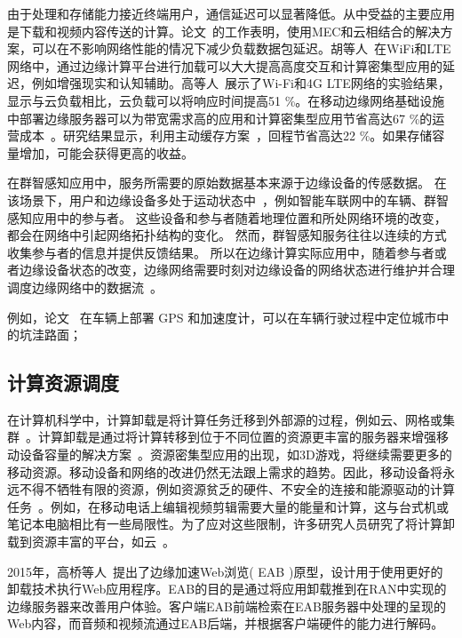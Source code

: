 由于处理和存储能力接近终端用户，通信延迟可以显著降低。从中受益的主要应用是下载和视频内容传送的计算。论文~\cite{DBLP:conf/infocom/RimalVM16}的工作表明，使用MEC和云相结合的解决方案，可以在不影响网络性能的情况下减少负载数据包延迟。胡等人~\cite{DBLP:conf/apsys/HuGHWACPS16}在WiFi和LTE网络中，通过边缘计算平台进行加载可以大大提高高度交互和计算密集型应用的延迟，例如增强现实和认知辅助。高等人~\cite{gao2015cloudlets}展示了Wi-Fi和4G LTE网络的实验结果，显示与云负载相比，云负载可以将响应时间提高51 \%。在移动边缘网络基础设施中部署边缘服务器可以为带宽需求高的应用和计算密集型应用节省高达67 \%的运营成本~\cite{DBLP:conf/saso/MehtaTKTKE16}。研究结果显示，利用主动缓存方案~\cite{DBLP:journals/cm/BastugBD14}，回程节省高达22 \%。如果存储容量增加，可能会获得更高的收益。

在群智感知应用中，服务所需要的原始数据基本来源于边缘设备的传感数据。
在该场景下，用户和边缘设备多处于运动状态中~\cite{}，例如智能车联网中的车辆、群智感知应用中的参与者。
这些设备和参与者随着地理位置和所处网络环境的改变，都会在网络中引起网络拓扑结构的变化。
然而，群智感知服务往往以连续的方式收集参与者的信息并提供反馈结果。
所以在边缘计算实际应用中，随着参与者或者边缘设备状态的改变，边缘网络需要时刻对边缘设备的网络状态进行维护并合理调度边缘网络中的数据流~\cite{}。


例如，论文~\cite{DBLP:journals/cm/GantiYL11} 在车辆上部署 GPS 和加速度计，可以在车辆行驶过程中定位城市中的坑洼路面；

\subsection{计算资源调度}

在计算机科学中，计算卸载是将计算任务迁移到外部源的过程，例如云、网格或集群~\cite{DBLP:journals/network/MaZZWP13}。计算卸载是通过将计算转移到位于不同位置的资源更丰富的服务器来增强移动设备容量的解决方案~\cite{DBLP:journals/monet/KumarLLB13}。资源密集型应用的出现，如3D游戏，将继续需要更多的移动资源。移动设备和网络的改进仍然无法跟上需求的趋势。因此，移动设备将永远不得不牺牲有限的资源，例如资源贫乏的硬件、不安全的连接和能源驱动的计算任务~\cite{DBLP:conf/ispa/KovachevYK12}。例如，在移动电话上编辑视频剪辑需要大量的能量和计算，这与台式机或笔记本电脑相比有一些局限性。为了应对这些限制，许多研究人员研究了将计算卸载到资源丰富的平台，如云~\cite{DBLP:conf/secon/HassanXWC15,DBLP:journals/pervasive/SatyanarayananBCD09,DBLP:journals/computer/KumarL10}。

2015年，高桥等人~\cite{DBLP:conf/mobilecloud/TakahashiTK15}提出了边缘加速Web浏览( EAB )原型，设计用于使用更好的卸载技术执行Web应用程序。EAB的目的是通过将应用卸载推到在RAN中实现的边缘服务器来改善用户体验。客户端EAB前端检索在EAB服务器中处理的呈现的Web内容，而音频和视频流通过EAB后端，并根据客户端硬件的能力进行解码。

